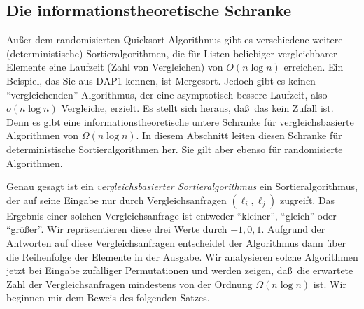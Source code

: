\documentclass[10pt,reqno]{amsart}
\numberwithin{equation}{section}
\begin{document}
\subsection{Die informationstheoretische Schranke}\label{sec_inf}
Au\ss er dem randomisierten Quicksort-Algorithmus gibt es verschiedene weitere (deterministische) Sortieralgorithmen, die f\"ur Listen beliebiger vergleichbarer Elemente eine Laufzeit (Zahl von Vergleichen) von $O(n\log n)$ erreichen.
Ein Beispiel, das Sie aus DAP1 kennen, ist Mergesort.
Jedoch gibt es keinen ``vergleichenden'' Algorithmus, der eine asymptotisch bessere Laufzeit, also $o(n\log n)$ Vergleiche, erzielt.
Es stellt sich heraus, da\ss\ das kein Zufall ist.
Denn es gibt eine informationstheoretische untere Schranke f\"ur vergleichsbasierte Algorithmen von $\Omega(n\log n)$.
In diesem Abschnitt leiten diesen Schranke f\"ur deterministische Sortieralgorithmen her.
Sie gilt aber ebenso f\"ur randomisierte Algorithmen.

Genau gesagt ist ein {\em vergleichsbasierter Sortieralgorithmus} ein Sortieralgorithmus, der auf seine Eingabe nur durch Vergleichsanfragen $(\ell_i,\ell_j)$ zugreift.
Das Ergebnis einer solchen Vergleichsanfrage ist entweder ``kleiner'', ``gleich'' oder ``gr\"o\ss er''.
Wir repr\"asentieren diese drei Werte durch $-1,0,1$.
Aufgrund der Antworten auf diese Vergleichsanfragen entscheidet der Algorithmus dann \"uber die Reihenfolge der Elemente in der Ausgabe.
Wir analysieren solche Algorithmen jetzt bei Eingabe zuf\"alliger Permutationen und werden zeigen, da\ss\ die erwartete Zahl der Vergleichsanfragen mindestens von der Ordnung $\Omega(n\log n)$ ist.
Wir beginnen mir dem Beweis des folgenden Satzes.
\end{document}
